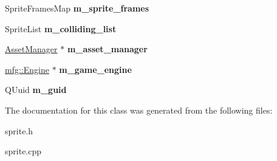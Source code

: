 \begin{DoxyCompactItemize}
Sprite\+Frames\+Map {\bfseries m\+\_\+sprite\+\_\+frames}
\item 
\mbox{\label{class_sprite_a4e0c8c16649b6f95e87c1af002f4375a}} 
Sprite\+List {\bfseries m\+\_\+colliding\+\_\+list}
\item 
\mbox{\label{class_sprite_af29e1d71cf77027699b3976598d6732c}} 
\hyperlink{class_asset_manager}{Asset\+Manager} $\ast$ {\bfseries m\+\_\+asset\+\_\+manager}
\item 
\mbox{\label{class_sprite_adad80bf689553b255a77881a8a0d21a7}} 
\hyperlink{classmfg_1_1_engine}{mfg\+::\+Engine} $\ast$ {\bfseries m\+\_\+game\+\_\+engine}
\item 
\mbox{\label{class_sprite_ad19296749b5cd1f97e28163386d08f1e}} 
Q\+Uuid {\bfseries m\+\_\+guid}
\end{DoxyCompactItemize}


The documentation for this class was generated from the following files\+:\begin{DoxyCompactItemize}
\item 
sprite.\+h\item 
sprite.\+cpp\end{DoxyCompactItemize}
